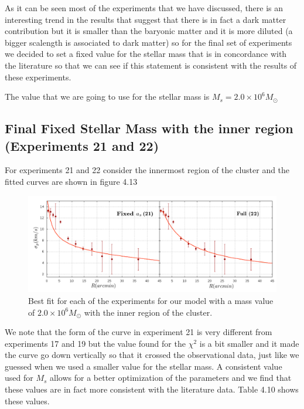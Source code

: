 As it can be seen most of the experiments that we have discussed, there is an interesting trend in the results that suggest that there is in fact a dark matter contribution but it is smaller than the baryonic matter and it is more diluted (a bigger scalength is associated to dark matter) so for the final set of experiments we decided to set a fixed value for the stellar mass that is in concordance with the literature so that we can see if this statement is consistent with the results of these experiments. 

The value that we are going to use for the stellar mass is $M_{s}=2.0 \times 10^{6} M_{\odot}$

\subsection{Final Fixed Stellar Mass with the inner region (Experiments 21 and 22)}

For experiments 21 and 22 consider the innermost region of the cluster and the fitted curves are shown in figure 4.13

\begin{figure}[H]
\centering
\includegraphics[width=15cm]{images/Starlight_25_12_1.png}
\caption[Best fits for our model with a mass value based on the Starlight procedures with the inner region.]{Best fit for each of the experiments for our model with a mass value of $2.0 \times 10^{6} M_{\odot}$ with the inner region of the cluster.}
\end{figure}

We note that the form of the curve in experiment 21 is very different from experiments 17 and 19 but the value found for the $\chi^{2}$ is a bit smaller and it made the curve go down vertically so that it crossed the observational data, just like we guessed when we used a smaller value for the stellar mass. A consistent value used for $M_s$ allows for a better optimization of the parameters and we find that these values are in fact more consistent with the literature data. Table 4.10 shows these values.

